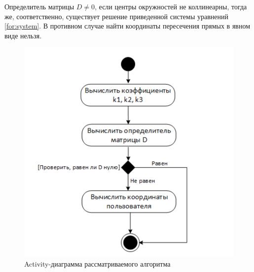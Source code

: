 Определитель матрицы $D \neq 0$, если центры окружностей не коллинеарны, тогда же, соответственно, существует решение приведенной системы уравнений \ref{for:system}. В противном случае найти координаты пересечения прямых в явном виде нельзя.

\begin{figure}[ht]
    \centering
    \includegraphics[scale=0.5]{img/powerCenterActivity}
    \caption{Activity-диаграмма рассматриваемого алгоритма}
\end{figure}